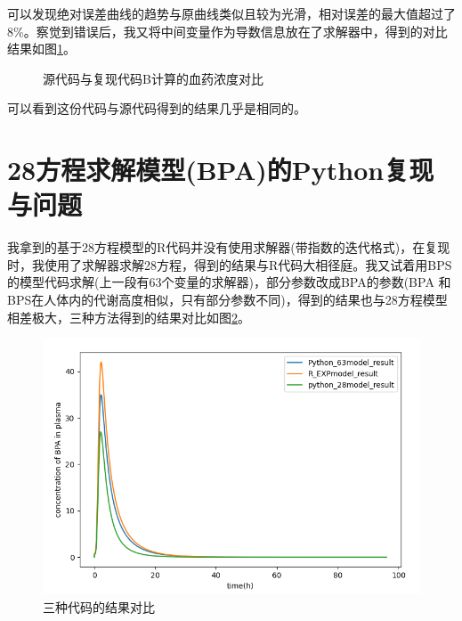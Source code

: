 \documentclass{article}
\begin{document}
可以发现绝对误差曲线的趋势与原曲线类似且较为光滑，相对误差的最大值超过了8\%。察觉到错误后，我又将中间变量作为导数信息放在了求解器中，得到的对比结果如图\ref{fig:main2}。
\begin{figure}
  \centering
  \caption{源代码与复现代码B计算的血药浓度对比}
  \label{fig:main2}
\end{figure}
可以看到这份代码与源代码得到的结果几乎是相同的。

\section*{28方程求解模型(BPA)的Python复现与问题}

我拿到的基于28方程模型的R代码并没有使用求解器(带指数的迭代格式)，在复现时，我使用了求解器求解28方程，得到的结果与R代码大相径庭。我又试着用BPS的模型代码求解(上一段有63个变量的求解器)，部分参数改成BPA的参数(BPA
和BPS在人体内的代谢高度相似，只有部分参数不同)，得到的结果也与28方程模型相差极大，三种方法得到的结果对比如图\ref{fig3}。
\begin{figure}[H]
  \centering
  \includegraphics[scale=0.5]{pic3.png}
  \caption{三种代码的结果对比}
  \label{fig3}
\end{figure}
\end{document}
